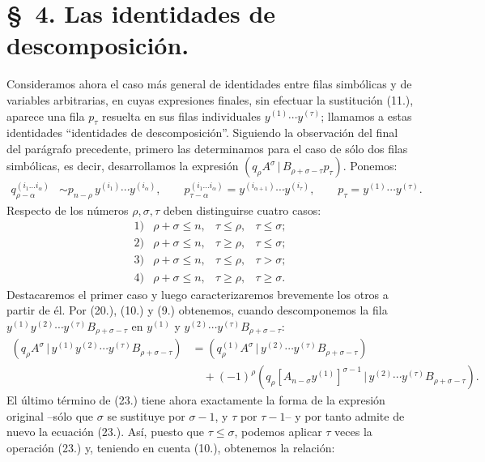 \documentclass[11pt]{article}
\newcommand{\pair}[2]{(#1\,|\,#2)}
\begin{document}
\section*{\S\ 4. Las identidades de descomposición.}
Consideramos ahora el caso más general de identidades entre filas simbólicas y de variables arbitrarias, en cuyas expresiones finales, sin efectuar la sustitución (11.), aparece una fila $p_\tau$ resuelta en sus filas individuales $y^{(1)}\cdots y^{(\tau)}$; llamamos a estas identidades ``identidades de descomposición''. Siguiendo la observación del final del parágrafo precedente, primero las determinamos para el caso de sólo dos filas simbólicas, es decir, desarrollamos la expresión $\pair{q_\rho A^\sigma}{B_{\rho+\sigma-\tau}p_\tau}$. Ponemos:
\begin{equation}
\begin{aligned}
q_{\rho-\alpha}^{(i_1\ldots i_\alpha)}&\sim p_{n-\rho}\,y^{(i_1)}\cdots y^{(i_\alpha)},\qquad
p_{\tau-\alpha}^{(i_1\ldots i_\alpha)}=y^{(i_{\alpha+1})}\cdots y^{(i_\tau)},\qquad
p_\tau=y^{(1)}\cdots y^{(\tau)}.
\end{aligned}
\tag{22}
\end{equation}
Respecto de los números $\rho,\sigma,\tau$ deben distinguirse cuatro casos:
\[
\begin{array}{llll}
1)&\rho+\sigma\le n,& \tau\le\rho,& \tau\le\sigma;\\[2pt]
2)&\rho+\sigma\le n,& \tau\ge\rho,& \tau\le\sigma;\\[2pt]
3)&\rho+\sigma\le n,& \tau\le\rho,& \tau>\sigma;\\[2pt]
4)&\rho+\sigma\le n,& \tau\ge\rho,& \tau\ge\sigma.
\end{array}
\]
Destacaremos el primer caso y luego caracterizaremos brevemente los otros a partir de él. Por (20.), (10.) y (9.) obtenemos, cuando descomponemos la fila $y^{(1)}y^{(2)}\cdots y^{(\tau)}B_{\rho+\sigma-\tau}$ en $y^{(1)}$ y $y^{(2)}\cdots y^{(\tau)}B_{\rho+\sigma-\tau}$:
\begin{equation}
\begin{aligned}
\pair{q_\rho A^\sigma}{y^{(1)}y^{(2)}\cdots y^{(\tau)}B_{\rho+\sigma-\tau}}
&=\pair{q_\rho^{(1)}A^\sigma}{y^{(2)}\cdots y^{(\tau)}B_{\rho+\sigma-\tau}}\\
&\quad+(-1)^\rho\pair{q_\rho[A_{n-\sigma}y^{(1)}]^{\sigma-1}}{y^{(2)}\cdots y^{(\tau)}B_{\rho+\sigma-\tau}}.
\end{aligned}
\tag{23}
\end{equation}
El último término de (23.) tiene ahora exactamente la forma de la expresión original --sólo que $\sigma$ se sustituye por $\sigma-1$, y $\tau$ por $\tau-1$-- y por tanto admite de nuevo la ecuación (23.). Así, puesto que $\tau\le\sigma$, podemos aplicar $\tau$ veces la operación (23.) y, teniendo en cuenta (10.), obtenemos la relación:
\end{document}
